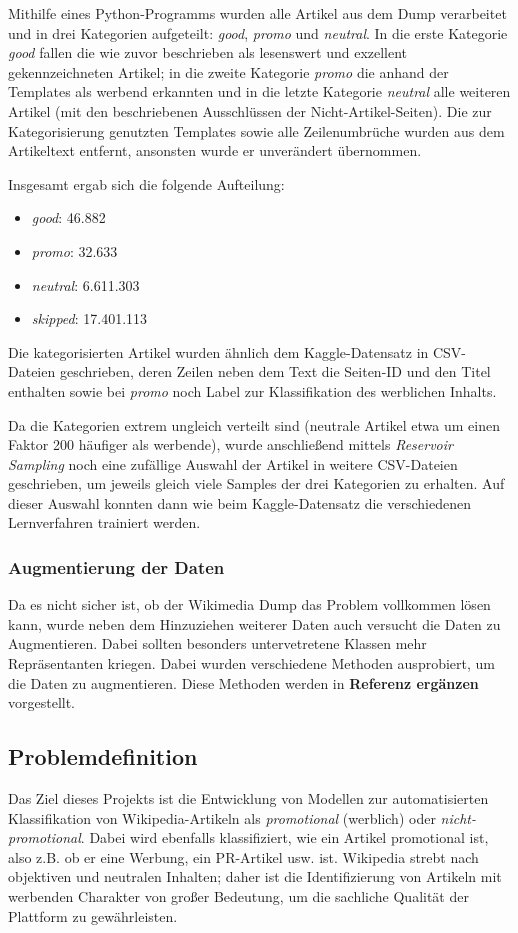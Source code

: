 Mithilfe eines Python-Programms wurden alle Artikel aus dem Dump verarbeitet und in drei Kategorien aufgeteilt: \emph{good}, \emph{promo} und \emph{neutral}. In die erste Kategorie \emph{good} fallen die wie zuvor beschrieben als lesenswert und exzellent gekennzeichneten Artikel; in die zweite Kategorie \emph{promo} die anhand der Templates als werbend erkannten und in die letzte Kategorie \emph{neutral} alle weiteren Artikel (mit den beschriebenen Ausschlüssen der Nicht-Artikel-Seiten). Die zur Kategorisierung genutzten Templates sowie alle Zeilenumbrüche wurden aus dem Artikeltext entfernt, ansonsten wurde er unverändert übernommen.

Insgesamt ergab sich die folgende Aufteilung:
\begin{itemize}
    \item \emph{good}: 46.882
    \item \emph{promo}: 32.633
    \item \emph{neutral}: 6.611.303
    \item \emph{skipped}: 17.401.113
\end{itemize}

Die kategorisierten Artikel wurden ähnlich dem Kaggle-Datensatz in CSV-Dateien geschrieben, deren Zeilen neben dem Text die Seiten-ID und den Titel enthalten sowie bei \emph{promo} noch Label zur Klassifikation des werblichen Inhalts.

Da die Kategorien extrem ungleich verteilt sind (neutrale Artikel etwa um einen Faktor 200 häufiger als werbende), wurde anschließend mittels \textit{Reservoir Sampling} \cite{ReservoirSampling} noch eine zufällige Auswahl der Artikel in weitere CSV-Dateien geschrieben, um jeweils gleich viele Samples der drei Kategorien zu erhalten. Auf dieser Auswahl konnten dann wie beim Kaggle-Datensatz die verschiedenen Lernverfahren trainiert werden.

\subsubsection{Augmentierung der Daten}
Da es nicht sicher ist, ob der Wikimedia Dump das Problem vollkommen lösen kann, wurde neben dem Hinzuziehen weiterer Daten auch versucht die Daten zu Augmentieren. Dabei sollten besonders untervetretene Klassen mehr Repräsentanten kriegen. Dabei wurden verschiedene Methoden ausprobiert, um die Daten zu augmentieren. Diese Methoden werden in \textbf{Referenz ergänzen} vorgestellt.

\subsection{Problemdefinition}
Das Ziel dieses Projekts ist die Entwicklung von Modellen zur automatisierten Klassifikation von Wikipedia-Artikeln als \emph{promotional} (werblich) oder \emph{nicht-promotional}. Dabei wird ebenfalls klassifiziert, wie ein Artikel promotional ist, also z.B. ob er eine Werbung, ein PR-Artikel usw. ist. Wikipedia strebt nach objektiven und neutralen Inhalten; daher ist die Identifizierung von Artikeln mit werbenden Charakter von großer Bedeutung, um die sachliche Qualität der Plattform zu gewährleisten.


